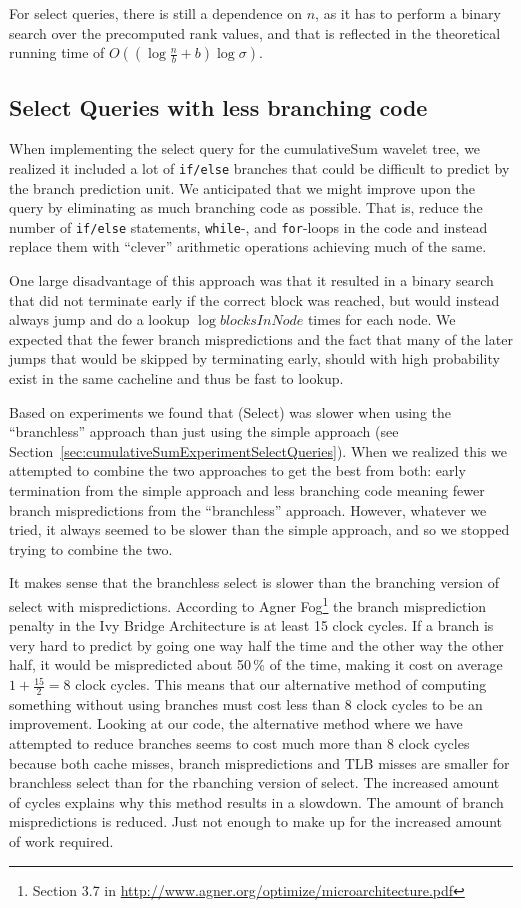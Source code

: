 For select queries, there is still a dependence on $n$, as it has to perform a binary search over the precomputed rank values, and that is reflected in the theoretical running time of $O((\log \frac{n}{b} + b) \log \sigma)$.

\subsection{Select Queries with less branching code}
When implementing the select query for the cumulativeSum wavelet tree, we realized it included a lot of \texttt{if/else} branches that could be difficult to predict by the branch prediction unit.
We anticipated that we might improve upon the query by eliminating as much branching code as possible.
That is, reduce the number of \texttt{if/else} statements, \texttt{while}-, and \texttt{for}-loops in the code and instead replace them with “clever” arithmetic operations achieving much of the same.

One large disadvantage of this approach was that it resulted in a binary search that did not terminate early if the correct block was reached, but would instead always jump and do a lookup $\log \mathit{blocksInNode}$ times for each node.
We expected that the fewer branch mispredictions and the fact that many of the later jumps that would be skipped by terminating early, should with high probability exist in the same cacheline and thus be fast to lookup.

Based on experiments we found that \textproc(Select) was slower when using the “branchless” approach than just using the simple approach (see Section~\ref{sec:cumulativeSumExperimentSelectQueries}).
When we realized this we attempted to combine the two approaches to get the best from both: early termination from the simple approach and less branching code meaning fewer branch mispredictions from the “branchless” approach.
However, whatever we tried, it always seemed to be slower than the simple approach, and so we stopped trying to combine the two.

It makes sense that the branchless select is slower than the branching version of select with mispredictions.
According to Agner Fog\footnote{Section 3.7 in \url{http://www.agner.org/optimize/microarchitecture.pdf}} the branch misprediction penalty in the Ivy Bridge Architecture is at least 15 clock cycles.
If a branch is very hard to predict by going one way half the time and the other way the other half, it would be mispredicted about 50\,\% of the time, making it cost on average $1+\frac{15}{2}=8$ clock cycles.
This means that our alternative method of computing something without using branches must cost less than 8 clock cycles to be an improvement.
Looking at our code, the alternative method where we have attempted to reduce branches seems to cost much more than 8 clock cycles because both cache misses, branch mispredictions and TLB misses are smaller for branchless select than for the rbanching version of select.
The increased amount of cycles explains why this method results in a slowdown.
The amount of branch mispredictions is reduced. Just not enough to make up for the increased amount of work required.

